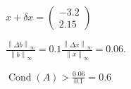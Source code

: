 \begin{frame}
\begin{solution}
\begin{enumerate}[a)]
			      \begin{math}
				      x+\delta x =
				      \begin{pmatrix}
					      -3.2 \\
					      2.15
				      \end{pmatrix}
			      \end{math}

			      \begin{math}
				      \frac{{\left\|\Delta b\right\|}_{\infty}}{{\left\|b\right\|}_{\infty}}=
				      0.1
				      \frac{{\left\|\Delta x\right\|}_{\infty}}{{\left\|x\right\|}_{\infty}}=
				      0.06
			      \end{math}.

			      \begin{math}
				      \operatorname{Cond}\left(A\right)>\frac{0.06}{0.1}=0.6
			      \end{math}
		\end{enumerate}
	\end{solution}
\end{frame}